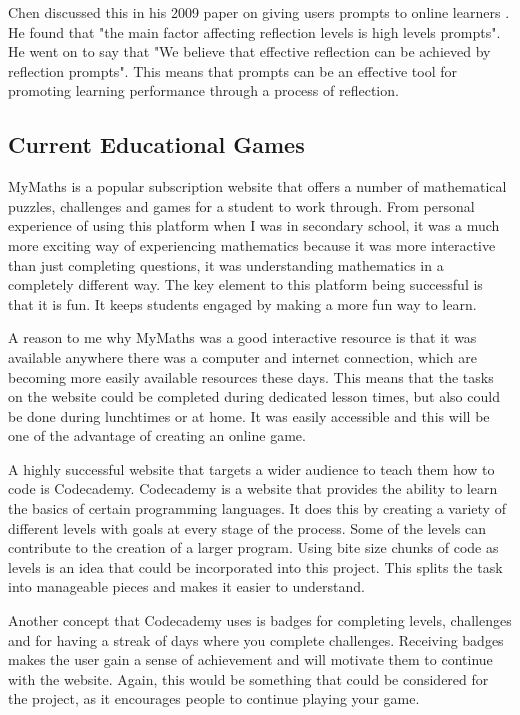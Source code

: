 \documentclass[a4paper]{article}
\begin{document}
Chen discussed this in his 2009 paper on giving users prompts to online learners \cite{chen2009effects}. He found that "the main factor affecting reflection levels is high levels prompts". He went on to say that "We believe that effective reflection can be achieved by reflection prompts". This means that prompts can be an effective tool for promoting learning performance through a process of reflection.

\subsection{Current Educational Games}

MyMaths is a popular subscription website that offers a number of mathematical puzzles, challenges and games for a student to work through. \cite{mymaths} From personal experience of using this platform when I was in secondary school, it was a much more exciting way of experiencing mathematics because it was more interactive than just completing questions, it was understanding mathematics in a completely different way. The key element to this platform being successful is that it is fun. It keeps students engaged by making a more fun way to learn.

A reason to me why MyMaths was a good interactive resource is that it was available anywhere there was a computer and internet connection, which are becoming more easily available resources these days. This means that the tasks on the website could be completed during dedicated lesson times, but also could be done during lunchtimes or at home. It was easily accessible and this will be one of the advantage of creating an online game.

A highly successful website that targets a wider audience to teach them how to code is Codecademy. \cite{codecademy} Codecademy is a website that provides the ability to learn the basics of certain programming languages. It does this by creating a variety of different levels with goals at every stage of the process. Some of the levels can contribute to the creation of a larger program. Using bite size chunks of code as levels is an idea that could be incorporated into this project. This splits the task into manageable pieces and makes it easier to understand.

Another concept that Codecademy uses is badges for completing levels, challenges and for having a streak of days where you complete challenges. Receiving badges makes the user gain a sense of achievement and will motivate them to continue with the website. Again, this would be something that could be considered for the project, as it encourages people to continue playing your game.
\end{document}
